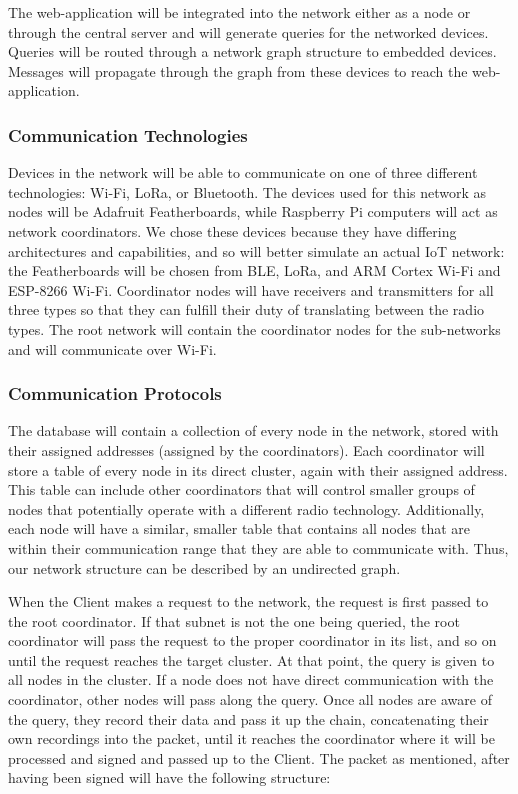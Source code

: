 \documentclass[tikz,a4paper,titlepage]{article}
\begin{document}
The web-application will be integrated into the network either as a node or through the central server and will generate queries for the networked devices. Queries will be routed through a network graph structure to embedded devices. Messages will propagate through the graph from these devices to reach the web-application.



\subsubsection{Communication Technologies}

Devices in the network will be able to communicate on one of three different technologies: Wi-Fi, LoRa, or Bluetooth. The devices used for this network as nodes will be Adafruit Featherboards, while Raspberry Pi computers will act as network coordinators. We chose these devices because they have differing architectures and capabilities, and so will better simulate an actual IoT network: the Featherboards will be chosen from BLE, LoRa, and ARM Cortex Wi-Fi and ESP-8266 Wi-Fi. Coordinator nodes will have receivers and transmitters for all three types so that they can fulfill their duty of translating between the radio types. The root network will contain the coordinator nodes for the sub-networks and will communicate over Wi-Fi.

\subsubsection{Communication Protocols}

The database will contain a collection of every node in the network, stored with their assigned addresses (assigned by the coordinators). Each coordinator will store a table of every node in its direct cluster, again with their assigned address. This table can include other coordinators that will control smaller groups of nodes that potentially operate with a different radio technology. Additionally, each node will have a similar, smaller table that contains all nodes that are within their communication range that they are able to communicate with. Thus, our network structure can be described by an undirected graph.

When the Client makes a request to the network, the request is first passed to the root coordinator. If that subnet is not the one being queried, the root coordinator will pass the request to the proper coordinator in its list, and so on until the request reaches the target cluster. At that point, the query is given to all nodes in the cluster. If a node does not have direct communication with the coordinator, other nodes will pass along the query. Once all nodes are aware of the query, they record their data and pass it up the chain, concatenating their own recordings into the packet, until it reaches the coordinator where it will be processed and signed and passed up to the Client. The packet as mentioned, after having been signed will have the following structure: \\
\end{document}
